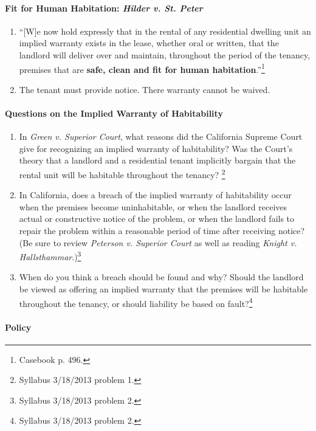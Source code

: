 \paragraph{Fit for Human Habitation: \emph{Hilder v. St. Peter}}

\begin{enumerate}
    \item ``[W]e now hold expressly that in the rental of any residential 
    dwelling unit an implied warranty exists in the lease, whether oral or 
    written, that the landlord will deliver over and maintain, throughout the 
    period of the tenancy, premises that are \textbf{safe, clean and fit for 
    human habitation}.''\footnote{Casebook p. 496.}
    \item The tenant must provide notice. There warranty cannot be waived.
\end{enumerate}

\paragraph{Questions on the Implied Warranty of Habitability} 

\begin{enumerate}
    \item In \emph{Green v. Superior Court}, what reasons did the California 
    Supreme Court give for recognizing an implied warranty of habitability?  
    Was the Court's theory that a landlord and a residential tenant implicitly 
    bargain that the rental unit will be habitable throughout the tenancy?  
    \footnote{Syllabus 3/18/2013 problem 1.}
    \item In California, does a breach of the implied warranty of habitability 
    occur when the premises become uninhabitable, or when the landlord 
    receives actual or constructive notice of the problem, or when the 
    landlord fails to repair the problem within a reasonable period of time 
    after receiving notice? (Be sure to review \emph{Peterson v. Superior 
    Court} as well as reading \emph{Knight v. 
    Hallsthammar}.)\footnote{Syllabus 3/18/2013 problem 2.}
    \item When do you think a breach should be found and why?  Should the 
    landlord be viewed as offering an implied warranty that the premises will 
    be habitable throughout the tenancy, or should liability be based on 
    fault?\footnote{Syllabus 3/18/2013 problem 2.}
\end{enumerate}

\paragraph{Policy}


